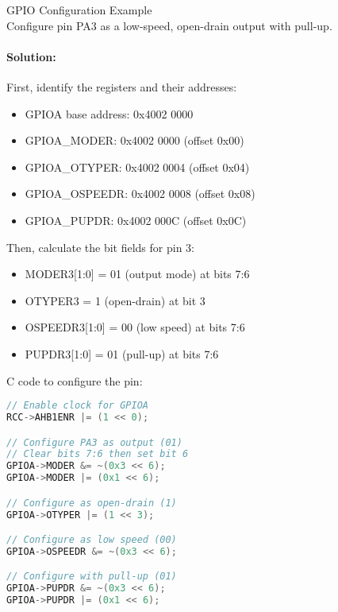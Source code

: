 \begin{example2}{GPIO Configuration Example}\\
Configure pin PA3 as a low-speed, open-drain output with pull-up.

\tcblower
\paragraph{Solution:}
First, identify the registers and their addresses:
\begin{itemize}
    \item GPIOA base address: 0x4002 0000
    \item GPIOA\_MODER: 0x4002 0000 (offset 0x00)
    \item GPIOA\_OTYPER: 0x4002 0004 (offset 0x04)
    \item GPIOA\_OSPEEDR: 0x4002 0008 (offset 0x08)
    \item GPIOA\_PUPDR: 0x4002 000C (offset 0x0C)
\end{itemize}

Then, calculate the bit fields for pin 3:
\begin{itemize}
    \item MODER3[1:0] = 01 (output mode) at bits 7:6
    \item OTYPER3 = 1 (open-drain) at bit 3
    \item OSPEEDR3[1:0] = 00 (low speed) at bits 7:6
    \item PUPDR3[1:0] = 01 (pull-up) at bits 7:6
\end{itemize}

C code to configure the pin:
\begin{lstlisting}[language=C, style=basesmol]
// Enable clock for GPIOA
RCC->AHB1ENR |= (1 << 0);

// Configure PA3 as output (01)
// Clear bits 7:6 then set bit 6
GPIOA->MODER &= ~(0x3 << 6);
GPIOA->MODER |= (0x1 << 6);

// Configure as open-drain (1)
GPIOA->OTYPER |= (1 << 3);

// Configure as low speed (00)
GPIOA->OSPEEDR &= ~(0x3 << 6);

// Configure with pull-up (01)
GPIOA->PUPDR &= ~(0x3 << 6);
GPIOA->PUPDR |= (0x1 << 6);
\end{lstlisting}
\end{example2}

